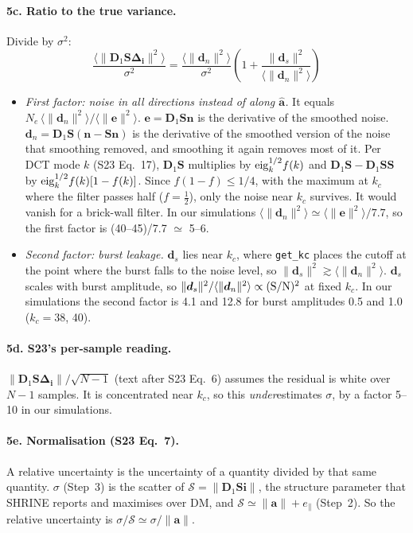 \documentclass[11pt]{article}
\newcommand{\vb}[1]{\boldsymbol{#1}}
\newcommand{\Dn}{\vb D_1}
\newcommand{\Sm}{\vb S}
\newcommand{\Di}{\vb\Delta_{\vb i}}
\newcommand{\ah}{\hat{\vb a}}
\newcommand{\nrm}[1]{\lVert #1\rVert}
\newcommand{\na}{\nrm{\vb a}}
\newcommand{\Sc}{\mathcal S}
\newcommand{\ep}{e_\parallel}
\begin{document}
\paragraph{5c. Ratio to the true variance.}
Divide by $\sigma^{2}$:
\begin{equation}
\boxed{\;\frac{\langle\nrm{\Dn\Sm\Di}^{2}\rangle}{\sigma^{2}}
=\frac{\langle\nrm{\vb d_n}^{2}\rangle}{\sigma^{2}}\left(1+\frac{\nrm{\vb d_s}^{2}}{\langle\nrm{\vb d_n}^{2}\rangle}\right)\;}
\label{eq:ratio}
\end{equation}
\begin{itemize}
\item \emph{First factor: noise in all directions instead of along $\ah$.} It equals
$N_e\,\langle\nrm{\vb d_n}^{2}\rangle/\langle\nrm{\vb e}^{2}\rangle$. $\vb e=\Dn\Sm\vb n$ is the derivative of the
smoothed noise. $\vb d_n=\Dn\Sm(\vb n-\Sm\vb n)$ is the derivative of the smoothed version of the noise that
smoothing removed, and smoothing it again removes most of it. Per DCT mode $k$ (S23 Eq.~17), $\Dn\Sm$
multiplies by ${\rm eig}_k^{1/2}f(k)$ and $\Dn\Sm-\Dn\Sm\Sm$ by ${\rm eig}_k^{1/2}f(k)[1-f(k)]$. Since
$f(1-f)\le1/4$, with the maximum at $k_c$ where the filter passes half ($f=\tfrac12$), only the noise near $k_c$
survives. It would vanish for a brick-wall filter. In our simulations
$\langle\nrm{\vb d_n}^{2}\rangle\simeq\langle\nrm{\vb e}^{2}\rangle/7.7$, so the first factor is (40--45)/7.7 $\simeq$ 5--6.
\item \emph{Second factor: burst leakage.} $\vb d_s$ lies near $k_c$, where \texttt{get\_kc} places the cutoff
at the point where the burst falls to the noise level, so $\nrm{\vb d_s}^{2}\gtrsim\langle\nrm{\vb d_n}^{2}\rangle$.
$\vb d_s$ scales with burst amplitude, so $\nrm{\vb d_s}^{2}/\langle\nrm{\vb d_n}^{2}\rangle\propto({\rm S/N})^{2}$
at fixed $k_c$. In our simulations the second factor is 4.1 and 12.8 for burst amplitudes 0.5 and 1.0 ($k_c=38$, 40).
\end{itemize}

\paragraph{5d. S23's per-sample reading.}
$\nrm{\Dn\Sm\Di}/\sqrt{N-1}$ (text after S23 Eq.~6) assumes the residual is white over $N-1$ samples. It is
concentrated near $k_c$, so this \emph{under}estimates $\sigma$, by a factor 5--10 in our simulations.

\paragraph{5e. Normalisation (S23 Eq.~7).}
A relative uncertainty is the uncertainty of a quantity divided by that same quantity. $\sigma$ (Step~3) is the
scatter of $\Sc=\nrm{\Dn\Sm\vb i}$, the structure parameter that SHRINE reports and maximises over DM, and
$\Sc\simeq\na+\ep$ (Step~2). So the relative uncertainty is $\sigma/\Sc\simeq\sigma/\na$.
\end{document}
